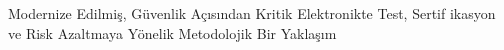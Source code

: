 Modernize Edilmiş, Güvenlik Açısından Kritik Elektronikte Test, Sertif\kern0pt ikasyon ve Risk Azaltmaya Yönelik Metodolojik Bir Yaklaşım